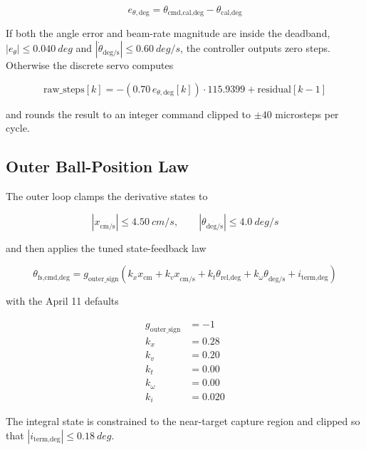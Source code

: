 \begin{equation}
  e_{\theta,\text{deg}} = \theta_{\text{cmd,cal,deg}} - \theta_{\text{cal,deg}}
\end{equation}

If both the angle error and beam-rate magnitude are inside the deadband,
$|e_{\theta}| \le \SI{0.040}{deg}$ and
$|\dot{\theta}_{\text{deg/s}}| \le \SI{0.60}{deg/s}$, the controller outputs zero
steps. Otherwise the discrete servo computes

\begin{equation}
  \text{raw\_steps}[k] =
  -\left(0.70\,e_{\theta,\text{deg}}[k]\right)\cdot 115.9399
  + \text{residual}[k-1]
\end{equation}

and rounds the result to an integer command clipped to $\pm 40$ microsteps per cycle.

\subsection{Outer Ball-Position Law}

The outer loop clamps the derivative states to

\begin{equation}
  |x_{\dot{\text{cm/s}}}| \le \SI{4.50}{cm/s},
  \qquad
  |\theta_{\dot{\text{deg/s}}}| \le \SI{4.0}{deg/s}
\end{equation}

and then applies the tuned state-feedback law

\begin{equation}
  \theta_{\text{fs,cmd,deg}}
  = g_{\text{outer\_sign}}
    \left(
      k_x x_{\text{cm}}
      + k_v x_{\dot{\text{cm/s}}}
      + k_t \theta_{\text{rel,deg}}
      + k_{\omega} \theta_{\dot{\text{deg/s}}}
      + i_{\text{term,deg}}
    \right)
\end{equation}

with the April 11 defaults

\begin{align}
  g_{\text{outer\_sign}} &= -1 \\
  k_x &= 0.28 \\
  k_v &= 0.20 \\
  k_t &= 0.00 \\
  k_{\omega} &= 0.00 \\
  k_i &= 0.020
\end{align}

The integral state is constrained to the near-target capture region and clipped so that
$|i_{\text{term,deg}}| \le \SI{0.18}{deg}$.

